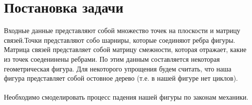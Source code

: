 \section{Постановка задачи}
   Входные данные представляют собой множество точек на плоскости и матрицу связей.Точки представляют собо шарниры, которые соединяют ребра фигуры. Матрица связей представляет собой матрицу смежности, которая отражает, какие из точек соеденинены ребрами. По этим данным составляется некоторая геометрическая фигура.  Для некоторого упрощения будем считать, что наша фигура представляет собой остовное дерево (т.е. в нашей фигуре нет циклов).
   \\\\Необходимо смоделировать процесс падения нашей фигуры по законам механики.